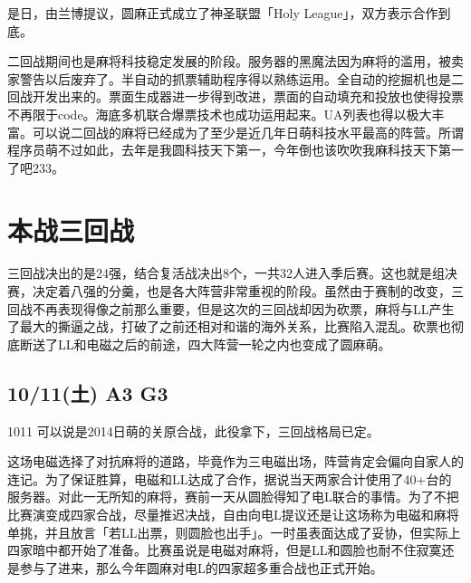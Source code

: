 是日，由兰博提议，圆麻正式成立了神圣联盟「Holy League」，双方表示合作到底。

二回战期间也是麻将科技稳定发展的阶段。服务器的黑魔法因为麻将的滥用，被卖家警告以后废弃了。半自动的抓票辅助程序得以熟练运用。全自动的挖掘机也是二回战开发出来的。票面生成器进一步得到改进，票面的自动填充和投放也使得投票不再限于code。海底多机联合爆票技术也成功运用起来。UA列表也得以极大丰富。可以说二回战的麻将已经成为了至少是近几年日萌科技水平最高的阵营。所谓程序员萌不过如此，去年是我圆科技天下第一，今年倒也该吹吹我麻科技天下第一了吧233。

\chapter{本战三回战}

三回战决出的是24强，结合复活战决出8个，一共32人进入季后赛。这也就是组决赛，决定着八强的分羹，也是各大阵营非常重视的阶段。虽然由于赛制的改变，三回战不再表现得像之前那么重要，但是这次的三回战却因为砍票，麻将与LL产生了最大的撕逼之战，打破了之前还相对和谐的海外关系，比赛陷入混乱。砍票也彻底断送了LL和电磁之后的前途，四大阵营一轮之内也变成了圆麻萌。

\section{10/11(土) A3 G3}



1011 可以说是2014日萌的关原合战，此役拿下，三回战格局已定。

这场电磁选择了对抗麻将的道路，毕竟作为三电磁出场，阵营肯定会偏向自家人的连记。为了保证胜算，电磁和LL达成了合作，据说当天两家合计使用了40+台的服务器。对此一无所知的麻将，赛前一天从圆脸得知了电L联合的事情。为了不把比赛演变成四家合战，尽量推迟决战，自由向电L提议还是让这场称为电磁和麻将单挑，并且放言「若LL出票，则圆脸也出手」。一时虽表面达成了妥协，但实际上四家暗中都开始了准备。比赛虽说是电磁对麻将，但是LL和圆脸也耐不住寂寞还是参与了进来，那么今年圆麻对电L的四家超多重合战也正式开始。

